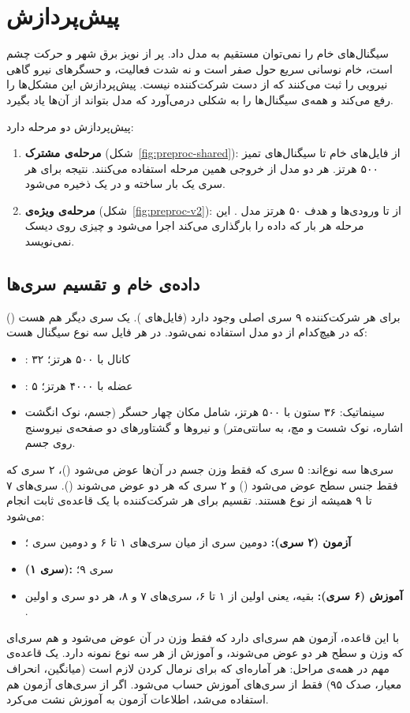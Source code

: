 \FloatBarrier
\section{پیش‌پردازش}
\label{sec:preproc}

سیگنال‌های خام را نمی‌توان مستقیم به مدل داد.  پر از نویز برق شهر و حرکت چشم است،  خام نوسانی سریع حول صفر است و نه شدت فعالیت، و حسگرهای نیرو گاهی نیرویی را ثبت می‌کنند که از دست شرکت‌کننده نیست. پیش‌پردازش این مشکل‌ها را رفع می‌کند و همه‌ی سیگنال‌ها را به شکلی درمی‌آورد که مدل بتواند از آن‌ها یاد بگیرد.

پیش‌پردازش دو مرحله دارد:
\begin{enumerate}
\item \textbf{مرحله‌ی مشترک} (شکل~\ref{fig:preproc-shared}): از فایل‌های خام تا سیگنال‌های تمیز ۵۰۰ هرتز. هر دو مدل از خروجی همین مرحله استفاده می‌کنند. نتیجه برای هر سری یک بار ساخته و در یک  ذخیره می‌شود.
\item \textbf{مرحله‌ی ویژه‌ی } (شکل~\ref{fig:preproc-v2}): از  تا ورودی‌ها و هدف ۵۰ هرتز مدل . این مرحله هر بار که  داده را بارگذاری می‌کند اجرا می‌شود و چیزی روی دیسک نمی‌نویسد.
\end{enumerate}

\subsection{داده‌ی خام و تقسیم سری‌ها}

برای هر شرکت‌کننده ۹ سری اصلی وجود دارد (فایل‌های ). یک سری دیگر هم هست () که در هیچ‌کدام از دو مدل استفاده نمی‌شود. در هر فایل سه نوع سیگنال هست:
\begin{itemize}
\item {}: ۳۲ کانال با ۵۰۰ هرتز؛
\item {}: ۵ عضله با ۴۰۰۰ هرتز؛
\item سینماتیک: ۳۶ ستون با ۵۰۰ هرتز، شامل مکان چهار حسگر (جسم، نوک انگشت اشاره، نوک شست و مچ، به سانتی‌متر) و نیروها و گشتاورهای دو صفحه‌ی نیروسنج روی جسم.
\end{itemize}

سری‌ها سه نوع‌اند: ۵ سری که فقط وزن جسم در آن‌ها عوض می‌شود ()، ۲ سری که فقط جنس سطح عوض می‌شود () و ۲ سری که هر دو عوض می‌شوند (). سری‌های ۷ تا ۹ همیشه از نوع  هستند. تقسیم برای هر شرکت‌کننده با یک قاعده‌ی ثابت انجام می‌شود:
\begin{itemize}
\item \textbf{آزمون (۲ سری):} دومین سری  از میان سری‌های ۱ تا ۶ و دومین سری ؛
\item \textbf{ (۱ سری):} سری ۹؛
\item \textbf{آموزش (۶ سری):} بقیه، یعنی اولین  از ۱ تا ۶، سری‌های ۷ و ۸، هر دو سری  و اولین .
\end{itemize}
با این قاعده، آزمون هم سری‌ای دارد که فقط وزن در آن عوض می‌شود و هم سری‌ای که وزن و سطح هر دو عوض می‌شوند، و آموزش از هر سه نوع نمونه دارد. یک قاعده‌ی مهم در همه‌ی مراحل: هر آماره‌ای که برای نرمال کردن لازم است (میانگین، انحراف معیار، صدک ۹۵) فقط از سری‌های آموزش حساب می‌شود. اگر از سری‌های آزمون هم استفاده می‌شد، اطلاعات آزمون به آموزش نشت می‌کرد.

